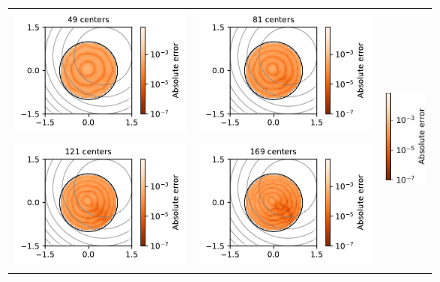\documentclass[12pt]{report} %
\begin{document}
\begin{figure}
  \hspace*{-.5cm}
  \begin{tabular}{ccl}
    {\includegraphics[width=.4\textwidth, clip=true,trim={0 0 2.1cm 0}]{imagenes/experiments/2d/statistical_2d_full_scheduler_interpolation/parabola/parabola_49.pdf}}                    &
    \includegraphics[width=.4\textwidth, clip=true,trim={0 0 2.1cm 0}]{imagenes/experiments/2d/statistical_2d_full_scheduler_interpolation/parabola/parabola_81.pdf}                      & \multirow{3}{*}{\includegraphics[width=.15\textwidth]{imagenes/experiments/2d/statistical_2d_full_scheduler_interpolation/parabola/colorbar_parabola.pdf}}    \\
    \multicolumn{1}{r}{\includegraphics[width=.4\textwidth, clip=true,trim={0 0 2.1cm 0}]{imagenes/experiments/2d/statistical_2d_full_scheduler_interpolation/parabola/parabola_121.pdf}} & \includegraphics[width=.4\textwidth, clip=true,trim={0 0 2.1cm 0}]{imagenes/experiments/2d/statistical_2d_full_scheduler_interpolation/parabola/parabola_169.pdf} & \\

\end{tabular}
\end{figure}
\end{document}
